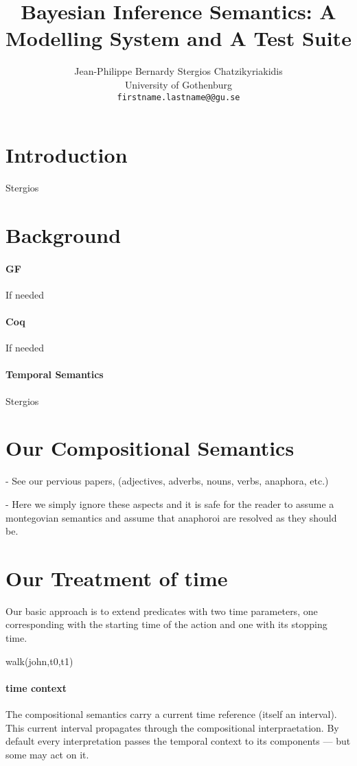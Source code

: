\documentclass[a4paper,11pt]{article}
\title{Bayesian Inference Semantics: A Modelling System and  A Test Suite}
\author{Jean-Philippe Bernardy \qquad Stergios Chatzikyriakidis \\
  University of Gothenburg\\
  {\tt firstname.lastname@@gu.se} \\}
\date{}
\begin{document}
\maketitle

\section{Introduction}
Stergios
\section{Background}
\paragraph{GF}
If needed
\paragraph{Coq}
If needed
\paragraph{Temporal Semantics}
Stergios

\section{Our Compositional Semantics}

- See our pervious papers, (adjectives, adverbs, nouns, verbs, anaphora, etc.)

- Here we simply ignore these aspects and it is safe for the reader to
assume a montegovian semantics and assume that anaphoroi are resolved
as they should be.

\section{Our Treatment of time}

Our basic approach is to extend predicates with two time parameters,
one corresponding with the starting time of the action and one with
its stopping time.

walk(john,t0,t1)

\paragraph{time context}

The compositional semantics carry a current time reference (itself an
interval). This current interval propagates through the compositional
interpraetation. By default every interpretation passes the temporal
context to its components --- but some may act on it.
\end{document}
